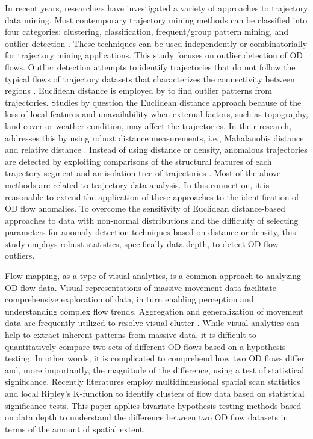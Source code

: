\documentclass[a4paper,UKenglish]{lipics-v2018}
\begin{document}
In recent years, researchers have investigated a variety of approaches to trajectory data mining.
Most contemporary trajectory mining methods can be classified into four categories: clustering, classification, frequent/group pattern mining, and outlier detection \cite{mazimpaka16JOSIS,zheng15ACMTIST}.
These techniques can be used independently or combinatorially for trajectory mining applications.
This study focuses on outlier detection of OD flows.
Outlier detection attempts to identify trajectories that do not follow the typical flows of trajectory datasets that characterizes the connectivity between regions \cite{mazimpaka16JOSIS}.
Euclidean distance is employed by \cite{fontes13GeoInfo,lee08ICDE} to find outlier patterns from trajectories.
Studies by \cite{pan13ACMGIS,liu12IJGIS} question the Euclidean distance approach because of the loss of local features and unavailability when external factors, such as topography, land cover or weather condition, may affect the trajectories.
In their research, \cite{pan13ACMGIS,liu12IJGIS} addresses this by using robust distance measurements, i.e., Mahalanobis distance \cite{pan13ACMGIS} and relative distance \cite{liu12IJGIS}.
Instead of using distance or density, anomalous trajectories are detected by exploiting comparisons of the structural features of each trajectory segment \cite{yuan11JCIS} and an isolation tree of trajectories \cite{zhang11UC}.
Most of the above methods are related to trajectory data analysis.
In this connection, it is reasonable to extend the application of these approaches to the identification of OD flow anomalies. 
To overcome the sensitivity of Euclidean distance-based approaches to data with non-normal distributions and the difficulty of selecting parameters for anomaly detection techniques based on distance or density, this study employs robust statistics, specifically data depth, to detect OD flow outliers.

Flow mapping, as a type of visual analytics, is a common approach to analyzing OD flow data.
Visual representations of massive movement data facilitate comprehensive exploration of data, in turn enabling perception and understanding complex flow trends.
Aggregation and generalization of movement data are frequently utilized to resolve visual clutter \cite{guo14IEEETVCG,yin2016exploring}.
While visual analytics can help to extract inherent patterns from massive data, it is difficult to quantitatively compare two sets of different OD flows based on a hypothesis testing.
In other words, it is complicated to comprehend how two OD flows differ and, more importantly, the magnitude of the difference, using a test of statistical significance.
Recently literatures employ multidimensional spatial scan statistics \cite{Gao17IJGIS} and local Ripley’s K-function \cite{tao16GA} to identify clusters of flow data based on statistical significance tests.
This paper applies bivariate hypothesis testing methods based on data depth to understand the difference between two OD flow datasets in terms of the amount of spatial extent. 
\end{document}
